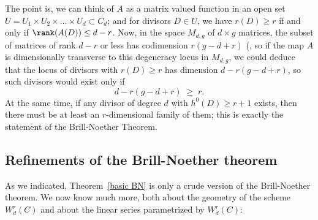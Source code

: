 The point is, we can think of $A$ as a matrix valued function in an open set $U = U_1 \times U_2 \times \dots \times U_d \subset C_d$; and for divisors $D \in U$, we have $r(D) \geq r$ if and only if $\rank(A(D)) \leq d-r$. Now, in the space $M_{d,g}$ of $d \times g$ matrices, the subset of matrices of rank $d-r$ or less has codimension $r(g-d+r)$ (\cite[Theorem ****]{Eisenbud1995},  so if the map $A$ is dimensionally transverse to this degeneracy locus in $M_{d,g}$, we could deduce that the locus of divisors with $r(D) \geq r$ has dimension $d - r(g-d+r)$, so such divisors would exist only if
$$
d - r(g-d+r) \; \geq \; r.
$$
At the same time, if any divisor of degree $d$ with $h^0(D) \geq r+1$ exists, then there must be at least an $r$-dimensional family of them; this is exactly the statement of the Brill-Noether Theorem.


\subsection{Refinements of the Brill-Noether theorem}

As we indicated, Theorem~\ref{basic BN} is only a crude version of the Brill-Noether theorem. We now know much more, both about the geometry of the scheme $W^r_d(C)$ and about the linear series parametrized by $W^r_d(C)$:


